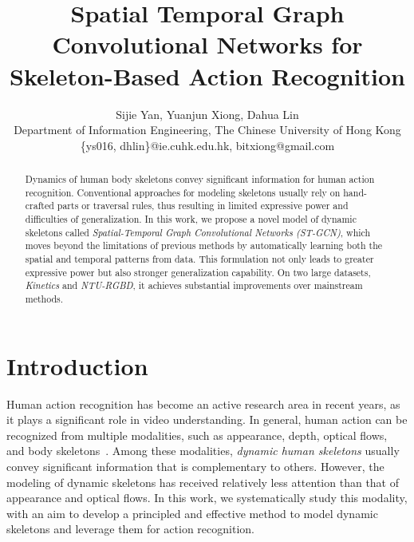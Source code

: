 \documentclass[letterpaper]{article} %
\begin{document}
%
\title{Spatial Temporal Graph Convolutional Networks for Skeleton-Based Action Recognition}
\author{Sijie Yan, Yuanjun Xiong, Dahua Lin\\
Department of Information Engineering, The Chinese University of Hong Kong\\
\{ys016, dhlin\}@ie.cuhk.edu.hk, bitxiong@gmail.com\\
}
\maketitle

\begin{abstract}

Dynamics of human body skeletons convey significant information
for human action recognition. Conventional approaches for modeling
skeletons usually rely on hand-crafted parts or traversal rules,
thus resulting in limited expressive power and difficulties
of generalization.
%
In this work, we propose a novel model of dynamic skeletons
called \emph{Spatial-Temporal Graph Convolutional Networks (ST-GCN)},
which moves beyond the limitations of previous methods by
automatically learning both the spatial and temporal patterns from data.
%
This formulation not only leads to greater expressive power
but also stronger generalization capability.
On two large datasets,
\emph{Kinetics} and \emph{NTU-RGBD}, it achieves substantial
improvements over mainstream methods.

\end{abstract}

\section{Introduction}

Human action recognition has become an active research area in recent years,
as it plays a significant role in video understanding.
In general, human action can be recognized from multiple modalities\cite{Simonyan2014NIPS,Tran2015C3D,Wang2015action,TSN2016ECCV,SSN2017ICCV},
such as appearance, depth, optical flows, and body skeletons~\cite{Du2015CVPR,Liu2016ECCV}.
%
Among these modalities, \emph{dynamic human skeletons} usually convey
significant information that is complementary to others.
However, the modeling of dynamic skeletons has received relatively less
attention than that of appearance and optical flows.
%
In this work, we systematically study this modality, with an aim to
develop a principled and effective method to model dynamic skeletons
and leverage them for action recognition.
\end{document}
